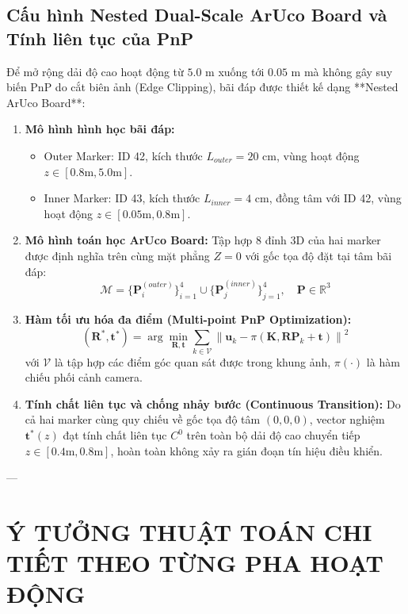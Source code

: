 \documentclass[12pt,a4paper]{article}
\begin{document}
\subsection{Cấu hình Nested Dual-Scale ArUco Board và Tính liên tục của PnP}
Để mở rộng dải độ cao hoạt động từ $5.0\text{ m}$ xuống tới $0.05\text{ m}$ mà không gây suy biến PnP do cắt biên ảnh (Edge Clipping), bãi đáp được thiết kế dạng **Nested ArUco Board**:
\begin{enumerate}[noitemsep,topsep=2pt]
    \item \textbf{Mô hình hình học bãi đáp:}
    \begin{itemize}[noitemsep]
        \item Outer Marker: ID 42, kích thước $L_{outer} = 20\text{ cm}$, vùng hoạt động $z \in [0.8\text{m}, 5.0\text{m}]$.
        \item Inner Marker: ID 43, kích thước $L_{inner} = 4\text{ cm}$, đồng tâm với ID 42, vùng hoạt động $z \in [0.05\text{m}, 0.8\text{m}]$.
    \end{itemize}
    \item \textbf{Mô hình toán học ArUco Board:} Tập hợp 8 đỉnh 3D của hai marker được định nghĩa trên cùng mặt phẳng $Z=0$ với gốc tọa độ đặt tại tâm bãi đáp:
    \begin{equation}
        \mathcal{M} = \{\mathbf{P}_i^{(outer)}\}_{i=1}^4 \cup \{\mathbf{P}_j^{(inner)}\}_{j=1}^4, \quad \mathbf{P} \in \mathbb{R}^3
    \end{equation}
    \item \textbf{Hàm tối ưu hóa đa điểm (Multi-point PnP Optimization):}
    \begin{equation}
        (\mathbf{R}^*, \mathbf{t}^*) = \arg\min_{\mathbf{R}, \mathbf{t}} \sum_{k \in \mathcal{V}} \left\| \mathbf{u}_k - \pi(\mathbf{K}, \mathbf{R} \mathbf{P}_k + \mathbf{t}) \right\|^2
    \end{equation}
    với $\mathcal{V}$ là tập hợp các điểm góc quan sát được trong khung ảnh, $\pi(\cdot)$ là hàm chiếu phối cảnh camera.
    \item \textbf{Tính chất liên tục và chống nhảy bước (Continuous Transition):} Do cả hai marker cùng quy chiếu về gốc tọa độ tâm $(0,0,0)$, vector nghiệm $\mathbf{t}^*(z)$ đạt tính chất liên tục $C^0$ trên toàn bộ dải độ cao chuyển tiếp $z \in [0.4\text{m}, 0.8\text{m}]$, hoàn toàn không xảy ra gián đoạn tín hiệu điều khiển.
\end{enumerate}

---

\section{Ý TƯỞNG THUẬT TOÁN CHI TIẾT THEO TỪNG PHA HOẠT ĐỘNG}
\end{document}
